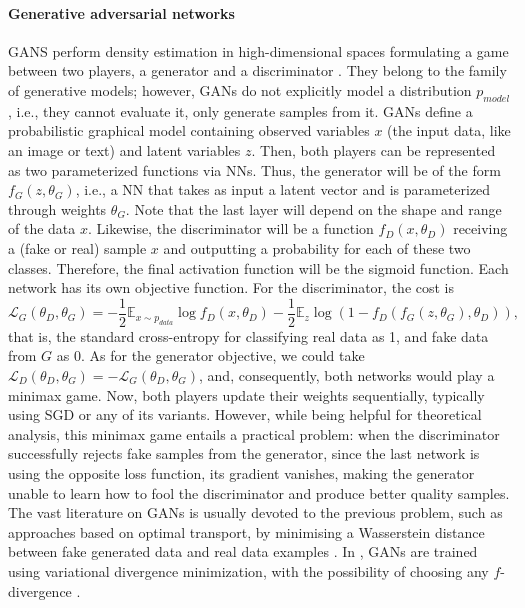 \paragraph{Generative adversarial networks} GANS  perform density estimation in high-dimensional spaces formulating a game between two players, a generator and a discriminator \parencite{goodfellow2014generative}. They belong to the family of generative models; however, GANs do not explicitly model a distribution $p_{model}$, i.e., they cannot evaluate it, only generate samples from it.
GANs define a probabilistic graphical model containing observed variables $x$ (the input data, like an image or text) and latent variables $z$. Then, both players can be represented as two parameterized functions via NNs. Thus, the generator will be of the form $f_G(z, \theta_G)$, i.e., a NN that takes as input a latent vector and is parameterized through weights $\theta_G$. Note that the last layer will depend on the shape and range of the data $x$. Likewise, the discriminator will be a function $f_D(x, \theta_D)$ receiving a (fake or real) sample $x$ and outputting a probability for each of these two classes. Therefore, the final activation function will be 
the sigmoid function. Each network has its own objective function. For the discriminator, the cost is
$$
\mathcal{L}_G(\theta_D, \theta_G) = -\dfrac{1}{2} \mathbb{E}_{x \sim p_{data}} \log f_D(x, \theta_D) -\dfrac{1}{2} \mathbb{E}_z \log (1 - f_D(f_G(z, \theta_G), \theta_D)),
$$
that is, the standard cross-entropy for classifying real data as 1, and fake data from $G$ as 0. As for the generator objective, we could take $\mathcal{L}_D(\theta_D, \theta_G) = -\mathcal{L}_G(\theta_D, \theta_G)$,
and, consequently, both networks would play a minimax game.
Now, both players update their weights sequentially, typically using SGD or any of its variants.
However, while being helpful for theoretical analysis, 
this minimax game entails a practical problem: when the discriminator successfully rejects fake samples from the generator, since the last network is using the opposite loss function, its gradient vanishes, making the generator unable to learn how to fool the discriminator and produce better quality samples.
The vast literature on GANs is usually devoted to the previous problem, such as approaches based  on optimal transport, by minimising a Wasserstein distance between fake generated data and real data examples \parencite{arjovsky2017wasserstein}. In \parencite{nowozin2016f}, GANs are trained using variational divergence minimization, with the possibility of choosing any $f$-divergence \parencite{CIT-004}.

